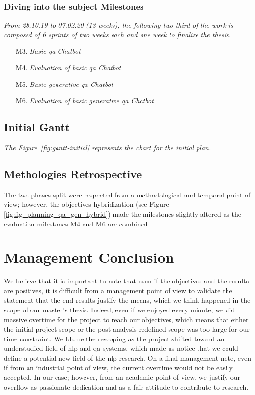 \subsubsection{Diving into the subject Milestones}
\textit{From 28.10.19 to 07.02.20 (13 weeks), the following two-third of the work is composed of 6 sprints of two weeks each and one week to finalize the thesis.}
\begin{itemize}
    \setlength\itemsep{0em}
    \item[\checkmark M3.] \textit{Basic \gls{qa} Chatbot}
    \item[\checkmark M4.] \textit{Evaluation of basic \gls{qa} Chatbot}
    \item[\checkmark M5.] \textit{Basic generative \gls{qa} Chatbot}
    \item[\checkmark M6.] \textit{Evaluation of basic generative \gls{qa} Chatbot}
\end{itemize}

\subsection{Initial Gantt}
\textit{The Figure~\ref{fig:gantt-initial} represents the chart for the initial plan.}

\subsection{Methologies Retrospective}
The two phases split were respected from a methodological and temporal point of view; however, the objectives hybridization (see Figure \ref{fig:fig_planning_qa_gen_hybrid}) made the milestones slightly altered as the evaluation milestones M4 and M6 are combined. 

\section{Management Conclusion}
We believe that it is important to note that even if the objectives and the results are positives, it is difficult from a management point of view to validate the statement that the end results justify the means, which we think happened in the scope of our master's thesis. Indeed, even if we enjoyed every minute, we did massive overtime for the project to reach our objectives, which means that either the initial project scope or the post-analysis redefined scope was too large for our time constraint. We blame the rescoping as the project shifted toward an understudied field of \gls{nlp} and \gls{qa} systems, which made us notice that we could define a potential new field of the \gls{nlp} research. On a final management note, even if from an industrial point of view, the current overtime would not be easily accepted. In our case; however, from an academic point of view, we justify our overflow as passionate dedication and as a fair attitude to contribute to research.

